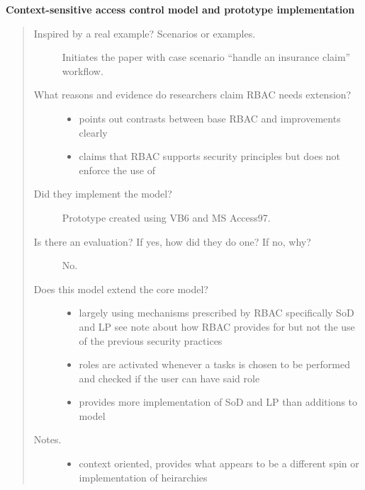 \documentclass[letterpaper,10pt,english]{sphinxmanual}
\begin{document}
\textbf{Context-sensitive access control model and prototype implementation}
\begin{quote}
\begin{description}
\item[{Inspired by a real example? Scenarios or examples.}] \leavevmode
Initiates the paper with case scenario ``handle an insurance claim'' workflow.

\item[{What reasons and evidence do researchers claim RBAC needs extension?}] \leavevmode\begin{itemize}
\item {} 
points out contrasts between base RBAC and improvements clearly

\item {} 
claims that RBAC supports security principles but does not enforce the use of

\end{itemize}

\item[{Did they implement the model?}] \leavevmode
Prototype created using VB6 and MS Access97.

\item[{Is there an evaluation? If yes, how did they do one? If no, why?}] \leavevmode
No.

\item[{Does this model extend the core model?}] \leavevmode\begin{itemize}
\item {} 
largely using mechanisms prescribed by RBAC specifically SoD and LP see note about how RBAC provides for but not the use of the previous security practices

\item {} 
roles are activated whenever a tasks is chosen to be performed and checked if the user can have said role

\item {} 
provides more implementation of SoD and LP than additions to model

\end{itemize}

\item[{Notes.}] \leavevmode\begin{itemize}
\item {} 
context oriented, provides what appears to be a different spin or implementation of heirarchies

\end{itemize}

\end{description}
\end{quote}
\end{document}
